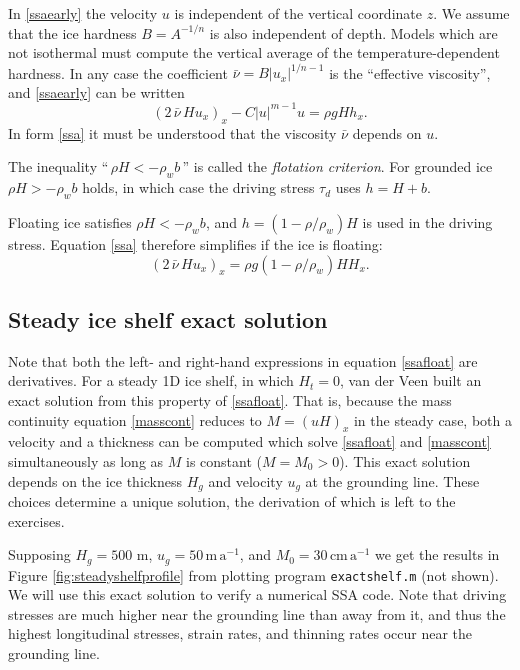 \documentclass[letterpaper,final,12pt,reqno]{amsart}
\begin{document}
In \eqref{ssaearly} the velocity $u$ is independent of the vertical coordinate $z$.  We assume that the ice hardness $B=A^{-1/n}$ is also independent of depth.  Models which are not isothermal must compute the vertical average of the temperature-dependent hardness.  In any case the coefficient $\bar \nu = B |u_x|^{1/n-1}$ is the ``effective viscosity'', and \eqref{ssaearly} can be written
\begin{equation}
  \left(2 \,\bar \nu\, H u_x\right)_x - C |u|^{m-1} u = \rho g H h_x.  \label{ssa}
\end{equation}
In form \eqref{ssa} it must be understood that the viscosity $\bar\nu$ depends on $u$.

The inequality ``$\,\rho H < - \rho_w b\,$'' is called the \emph{flotation criterion}.  For grounded ice $\rho H > - \rho_w b$ holds, in which case the driving stress $\tau_d$ uses $h = H+b$.

Floating ice satisfies $\rho H < - \rho_w b$, and $h = (1-\rho/\rho_w) H$ is used in the driving stress.  Equation \eqref{ssa} therefore simplifies if the ice is floating:
\begin{equation}
   \left(2 \,\bar\nu\, H u_x\right)_x = \rho g (1-\rho/\rho_w) H H_x. \label{ssafloat}
\end{equation}


\subsection*{Steady ice shelf exact solution}  Note that both the left- and right-hand expressions in equation \eqref{ssafloat} are derivatives.  For a steady 1D ice shelf, in which $H_t=0$, van der Veen \cite{vanderVeen83} built an exact solution from this property of \eqref{ssafloat}.  That is, because the mass continuity equation \eqref{masscont} reduces to $M=(uH)_x$ in the steady case, both a velocity and a thickness can be computed \cite{vanderVeen83} which solve \eqref{ssafloat} and \eqref{masscont} simultaneously as long as $M$ is constant ($M=M_0>0$).  This exact solution depends on the ice thickness $H_g$ and velocity $u_g$ at the grounding line.  These choices determine a unique solution, the derivation of which is left to the exercises.

Supposing $H_g=500$ m, $u_g = 50 \,\text{m}\,\text{a}^{-1}$, and $M_0=30 \,\text{cm}\,\text{a}^{-1}$ we get the results in Figure \ref{fig:steadyshelfprofile} from plotting program \texttt{exactshelf.m} (not shown).  We will use this exact solution to verify a numerical SSA code.  Note that driving stresses are much higher near the grounding line than away from it, and thus the highest longitudinal stresses, strain rates, and thinning rates occur near the grounding line.
\end{document}
